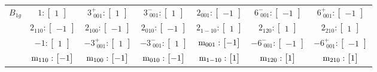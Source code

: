 \documentclass[fleqn,8pt,landscape]{jsarticle}
\begin{document}
\begin{longtable}{ccccccc}
$ B_{1g} $ & $ 1:\begin{bmatrix} 1 \end{bmatrix} $ & $ 3^{+}_{\,\,001}:\begin{bmatrix} 1 \end{bmatrix} $ & $ 3^{-}_{\,\,001}:\begin{bmatrix} 1 \end{bmatrix} $ & $ 2{}_{001}:\begin{bmatrix} -1 \end{bmatrix} $ & $ 6^{-}_{\,\,001}:\begin{bmatrix} -1 \end{bmatrix} $ & $ 6^{+}_{\,\,001}:\begin{bmatrix} -1 \end{bmatrix} $ \\
& $ 2{}_{110}:\begin{bmatrix} -1 \end{bmatrix} $ & $ 2{}_{100}:\begin{bmatrix} -1 \end{bmatrix} $ & $ 2{}_{010}:\begin{bmatrix} -1 \end{bmatrix} $ & $ 2{}_{1-10}:\begin{bmatrix} 1 \end{bmatrix} $ & $ 2{}_{120}:\begin{bmatrix} 1 \end{bmatrix} $ & $ 2{}_{210}:\begin{bmatrix} 1 \end{bmatrix} $ \\
& $ -1:\begin{bmatrix} 1 \end{bmatrix} $ & $ -3^{+}_{\,\,001}:\begin{bmatrix} 1 \end{bmatrix} $ & $ -3^{-}_{\,\,001}:\begin{bmatrix} 1 \end{bmatrix} $ & $ {\rm m}_{001}:\begin{bmatrix} -1 \end{bmatrix} $ & $ -6^{-}_{\,\,001}:\begin{bmatrix} -1 \end{bmatrix} $ & $ -6^{+}_{\,\,001}:\begin{bmatrix} -1 \end{bmatrix} $ \\
& $ {\rm m}_{110}:\begin{bmatrix} -1 \end{bmatrix} $ & $ {\rm m}_{100}:\begin{bmatrix} -1 \end{bmatrix} $ & $ {\rm m}_{010}:\begin{bmatrix} -1 \end{bmatrix} $ & $ {\rm m}_{1-10}:\begin{bmatrix} 1 \end{bmatrix} $ & $ {\rm m}_{120}:\begin{bmatrix} 1 \end{bmatrix} $ & $ {\rm m}_{210}:\begin{bmatrix} 1 \end{bmatrix} $ \\ \hline

\end{longtable}
\end{document}
